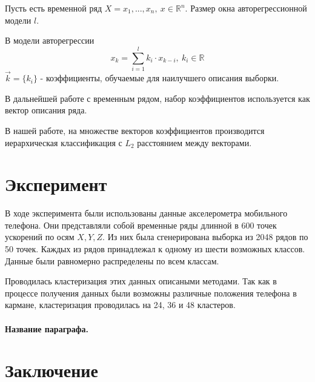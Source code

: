 \documentclass[12pt,twoside]{article}
\begin{document}
            Пусть есть временной ряд $X = x_1, ... , x_n, \ x \in \mathbb{R}^n$.
            Размер окна авторегрессионной модели $l$.

            В модели авторегрессии $$ x_k = \sum\limits_{i=1}^{l} k_i \cdot x_{k-i}, \ k_i \in \mathbb{R} $$
            $\vec{k} = \{k_i\}$ \-- коэффициенты, обучаемые для наилучшего описания выборки.

            В дальнейшей работе с временным рядом, набор коэффициентов используется как вектор описания ряда.

            В нашей работе, на множестве векторов коэффициентов производится иерархическая классификация с $L_2$ расстоянием между векторами.

        
    \section{Эксперимент}
        
        В ходе эксперимента были использованы данные акселерометра мобильного телефона.
        Они представляли собой временные ряды длинной в 600 точек ускорений по осям $X, Y, Z$.
        Из них была сгенерирована выборка из 2048 рядов по 50 точек.
        Каждых из рядов принадлежал к одному из шести возможных классов. Данные были равномерно распределены по всем классам.

        Проводилась кластеризация этих данных описаными методами.
        Так как в процессе получения данных были возможны различные положения телефона в кармане, кластеризация проводилась на 24, 36 и 48 кластеров.

    \paragraph{Название параграфа.}
    \section{Заключение}

	 
    
    
    
\end{document}
